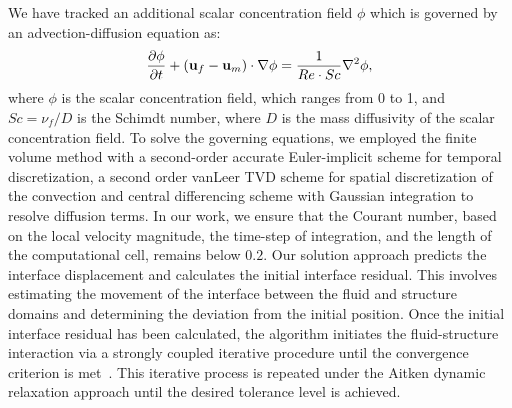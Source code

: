 \documentclass[%
 aip,
 amsmath,amssymb,
 reprint,
]{revtex4-1}
\begin{document}
We have tracked an additional scalar concentration field $\phi$ which is governed by an advection-diffusion equation as: 
\begin{equation*}
	{\partial\phi\over\partial t}+(\mathbf{u}_f-\mathbf{u}_m)\cdot\mathbf{\nabla}\mathbf{\phi} = \frac{1}{Re\cdot Sc}\nabla^2\mathbf{\phi},
\end{equation*}
where $\phi$ is the scalar concentration field, which ranges from 0 to 1, and $Sc=\nu_f/D$ is the Schimdt number, where $D$ is the mass diffusivity of the scalar concentration field. To solve the governing equations, we employed the finite volume method with a second-order accurate Euler-implicit scheme for temporal discretization, a second order vanLeer TVD scheme for spatial discretization of the convection and central differencing scheme with Gaussian integration to resolve diffusion terms. In our work, we ensure that the Courant number, based on the local velocity magnitude, the time-step of integration, and the length of the computational cell, remains below $0.2$. Our solution approach predicts the interface displacement and calculates the initial interface residual. This involves estimating the movement of the interface between the fluid and structure domains and determining the deviation from the initial position. Once the initial interface residual has been calculated, the algorithm initiates the fluid-structure interaction via a strongly coupled iterative procedure until the convergence criterion is met~\cite{Hrvoje2007, CampbellPaterson2011}. This iterative process is repeated under the Aitken dynamic relaxation approach until the desired tolerance level is achieved.
\end{document}
